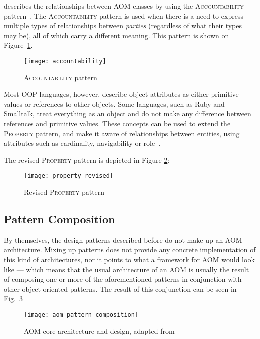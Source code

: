 \cite{YJ02} describes the relationships between AOM classes by using the \textsc{Accountability} pattern~\cite{fowler, hay}. The \textsc{Accountability} pattern is used when there is a need to express multiple types of relationships between \emph{parties} (regardless of what their types may be), all of which carry a different meaning\cite{fowler_accountability}. This pattern is shown on Figure~\ref{fig:accountability}.

\begin{figure}[H]
  \centering
  \texttt{[image: accountability]}
  \caption{\textsc{Accountability} pattern}
  \label{fig:accountability}
\end{figure}

Most OOP languages, however, describe object attributes as either primitive values or references to other objects. Some languages, such as Ruby and Smalltalk, treat everything as an object and do not make any difference between references and primitive values. These concepts can be used to extend the \textsc{Property} pattern, and make it aware of relationships between entities, using attributes such as cardinality, navigability or role~\cite{aom_research_roadmap}.

The revised \textsc{Property} pattern is depicted in Figure \ref{fig:property_revised}:

\begin{figure}[H]
  \centering
  \texttt{[image: property\_revised]}
  \caption{Revised \textsc{Property} pattern}
  \label{fig:property_revised}
\end{figure}

\subsection{Pattern Composition}\label{sec:aom_pattern_composition}

By themselves, the design patterns described before do not make up an AOM architecture. Mixing up patterns does not provide any concrete implementation of this kind of architectures, nor it points to what a framework for AOM would look like --- which means that the usual architecture of an AOM is usually the result of composing one or more of the aforementioned patterns in conjunction with other object-oriented patterns. The result of this conjunction can be seen in Fig.~\ref{fig:aom_pattern_composition}

\begin{figure}[H]
  \centering
  \texttt{[image: aom\_pattern\_composition]}
  \caption{AOM core architecture and design, adapted from \cite{YBJ01}}
  \label{fig:aom_pattern_composition}
\end{figure}

